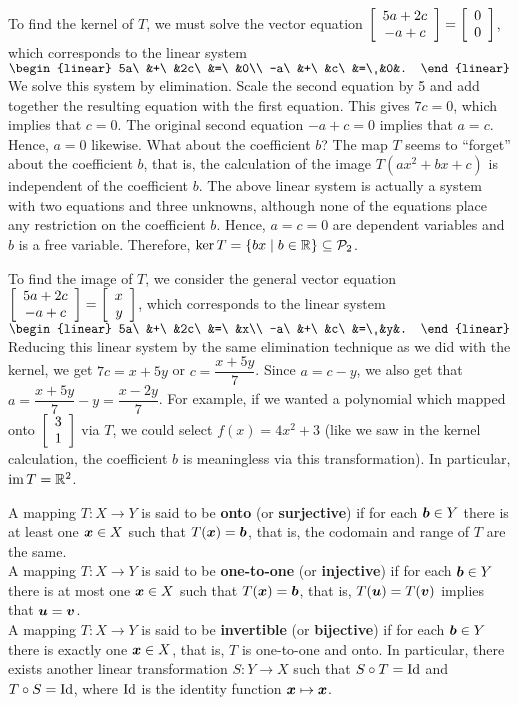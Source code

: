 \begin{Exam}
To find the kernel of $T$, we must solve the vector equation $\mtx{c}{5a+2c\\-a+c} = \vr{0\\0}$, which corresponds to the linear system $\begin{linear}
5a\ &+\ &2c\ &=\ &0\\ -a\ &+\ &c\ &=\ &0&.
\end{linear}$ We solve this system by elimination. Scale the second equation by 5 and add together the resulting equation with the first equation. This gives $7c=0$, which implies that $c=0$. The original second equation $-a+c=0$ implies that $a=c$. Hence, $a=0$ likewise. What about the coefficient $b$? The map $T$ seems to ``forget'' about the coefficient $b$, that is, the calculation of the image $T(ax^2+bx+c)$ is independent of the coefficient $b$. The above linear system is actually a system with two equations and three unknowns, although none of the equations place any restriction on the coefficient $b$. Hence, $a=c=0$ are dependent variables and $b$ is a free variable. Therefore, $\ker T = \{bx\mid b\in \R\} \subseteq\mathcal{P}_2$. 

To find the image of $T$, we consider the general vector equation $\mtx{c}{5a+2c\\-a+c} = \vr{x\\y}$, which corresponds to the linear system $\begin{linear}
5a\ &+\ &2c\ &=\ &x\\ -a\ &+\ &c\ &=\ &y&.
\end{linear}$ Reducing this linear system by the same elimination technique as we did with the kernel, we get $7c=x+5y$ or $c=\dfrac{x+5y}{7}$. Since $a=c-y$, we also get that $a=\dfrac{x+5y}{7}-y = \dfrac{x-2y}{7}$. For example, if we wanted a polynomial which mapped onto $\vr{3\\1}$ via $T$, we could select $f(x)=4x^2+3$ (like we saw in the kernel calculation, the coefficient $b$ is meaningless via this transformation). In particular, $\im T= \R^2$. 
\end{Exam}

\begin{Def}\label{def:injective}
A mapping $T : X \to Y$ is said to be \textbf{onto} (or \textbf{surjective}) if for each $\bb b\in Y$ there is at least one $\bb x\in X$ such that $T(\bb x) = \bb b$, that is, the codomain and range of $T$ are the same.\\

A mapping $T : X \to Y$ is said to be \textbf{one-to-one} (or \textbf{injective}) if for each $\bb b\in Y$ there is at most one $\bb x\in X$ such that $T(\bb x) = \bb b$, that is, $T(\bb u ) = T(\bb v)$ implies that $\bb u = \bb v$.\\

A mapping $T : X \to Y$ is said to be \textbf{invertible} (or \textbf{bijective}) if for each $\bb b\in Y$ there is exactly one $\bb x\in X$, that is, $T$ is one-to-one and onto. In particular, there exists another linear transformation $S : Y \to X$ such that $S\circ T = \Id$ and $T\circ S = \Id$, where $\Id$ is the identity function $\bb x \mapsto \bb x$.\\
\end{Def}

